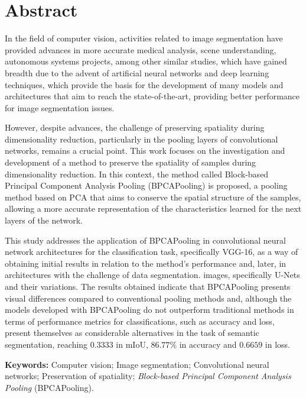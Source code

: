 \section*{Abstract}
\thispagestyle{empty}
In the field of computer vision, activities related to image segmentation have provided advances in more accurate medical analysis, scene understanding, autonomous systems projects, among other similar studies, which have gained breadth due to the advent of artificial neural networks and deep learning techniques, which provide the basis for the development of many models and architectures that aim to reach the state-of-the-art, providing better performance for image segmentation issues.

However, despite advances, the challenge of preserving spatiality during dimensionality reduction, particularly in the pooling layers of convolutional networks, remains a crucial point. This work focuses on the investigation and development of a method to preserve the spatiality of samples during dimensionality reduction. In this context, the method called Block-based Principal Component Analysis Pooling (BPCAPooling) is proposed, a pooling method based on PCA that aims to conserve the spatial structure of the samples, allowing a more accurate representation of the characteristics learned for the next layers of the network.

This study addresses the application of BPCAPooling in convolutional neural network architectures for the classification task, specifically VGG-16, as a way of obtaining initial results in relation to the method's performance and, later, in architectures with the challenge of data segmentation. images, specifically U-Nets and their variations. The results obtained indicate that BPCAPooling presents visual differences compared to conventional pooling methods and, although the models developed with BPCAPooling do not outperform traditional methods in terms of performance metrics for classifications, such as accuracy and loss, present themselves as considerable alternatives in the task of semantic segmentation, reaching $0.3333$ in mIoU, $86.77\%$ in accuracy and $0.6659$ in loss.

\textbf{Keywords:} Computer vision; Image segmentation; Convolutional neural networks; Preservation of spatiality; \textit{Block-based Principal Component Analysis Pooling} (BPCAPooling).